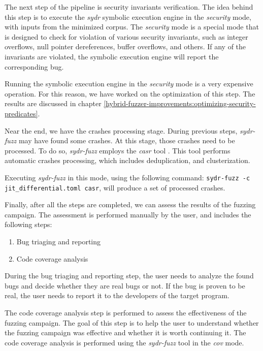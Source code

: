 
The next step of the pipeline is security invariants verification. The idea behind this step is to execute the \textit{sydr} symbolic execution engine in the \textit{security} mode, with inputs from the minimized corpus. The \textit{security} mode is a special mode that is designed to check for violation of various security invariants, such as integer overflows, null pointer dereferences, buffer overflows, and others. If any of the invariants are violated, the symbolic execution engine will report the corresponding bug.

Running the symbolic execution engine in the \textit{security} mode is a very expensive operation. For this reason, we have worked on the optimization of this step. The results are discussed in chapter \ref{hybrid-fuzzer-improvements:optimizing-security-predicates}.


Near the end, we have the crashes processing stage. During previous steps, \textit{sydr-fuzz} may have found some crashes. At this stage, those crashes need to be processed. To do so, \textit{sydr-fuzz} employs the \textit{casr} tool \cite{casr-cluster-ispras-2021}. This tool performs automatic crashes processing, which includes deduplication, and clusterization.

Executing \textit{sydr-fuzz} in this mode, using the following command: \texttt{sydr-fuzz -c jit\_differential.toml casr}, will produce a set of processed crashes.

Finally, after all the steps are completed, we can assess the results of the fuzzing campaign. The assessment is performed manually by the user, and includes the following steps:

\begin{enumerate}
    \item Bug triaging and reporting
    \item Code coverage analysis
\end{enumerate}

During the bug triaging and reporting step, the user needs to analyze the found bugs and decide whether they are real bugs or not. If the bug is proven to be real, the user needs to report it to the developers of the target program.

The code coverage analysis step is performed to assess the effectiveness of the fuzzing campaign. The goal of this step is to help the user to understand whether the fuzzing campaign was effective and whether it is worth continuing it. The code coverage analysis is performed using the \textit{sydr-fuzz} tool in the \textit{cov} mode.


